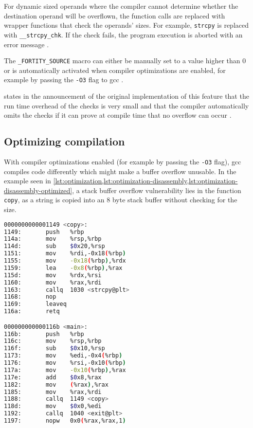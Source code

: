 For dynamic sized operands where the compiler cannot determine whether the destination operand will be overflown, the function calls are replaced with wrapper functions that check the operands' sizes.
For example, \texttt{strcpy} is replaced with \texttt{\_\_strcpy\_chk}.
If the check fails, the program execution is aborted with an error message \cite{Kerrisk2020,Sharma2014}.

The \texttt{\_FORTITY\_SOURCE} macro can either be manually set to a value higher than 0 or is automatically activated when compiler optimizations are enabled, for example by passing the \texttt{-O3} flag to \gls{gcc} \cite{Kerrisk2020,Sharma2014,Sidhpurwala2018}.

 states in the announcement of the original implementation of this feature that the run time overhead of the checks is very small and that the compiler automatically omits the checks if it can prove at compile time that no overflow can occur \cite{Jelinek2004}.

\subsection{Optimizing compilation}
\label{subsec:optimizing-compilation}

With compiler optimizations enabled (for example by passing the \texttt{-O3} flag), \gls{gcc} compiles code differently which might make a buffer overflow unusable.
In the example seen in \cref{lst:optimization,lst:optimization-disassembly,lst:optimization-disassembly-optimized}, a stack buffer overflow vulnerability lies in the function \texttt{copy}, as a string is copied into an 8 byte stack buffer without checking for the size.



\begin{lstlisting}[language=bash,float=ht,caption={Disassembly excerpt of the 64 bit binary compiled from the code in \cref{lst:optimization} with \texttt{gcc -o copy optimization.c -fno-stack-protector}, retrieved with \texttt{objdump -D --no-show-raw-insn copy}}, label={lst:optimization-disassembly}]
0000000000001149 <copy>:
1149:       push   %rbp
114a:       mov    %rsp,%rbp
114d:       sub    $0x20,%rsp
1151:       mov    %rdi,-0x18(%rbp)
1155:       mov    -0x18(%rbp),%rdx
1159:       lea    -0x8(%rbp),%rax
115d:       mov    %rdx,%rsi
1160:       mov    %rax,%rdi
1163:       callq  1030 <strcpy@plt>
1168:       nop
1169:       leaveq
116a:       retq

000000000000116b <main>:
116b:       push   %rbp
116c:       mov    %rsp,%rbp
116f:       sub    $0x10,%rsp
1173:       mov    %edi,-0x4(%rbp)
1176:       mov    %rsi,-0x10(%rbp)
117a:       mov    -0x10(%rbp),%rax
117e:       add    $0x8,%rax
1182:       mov    (%rax),%rax
1185:       mov    %rax,%rdi
1188:       callq  1149 <copy>
118d:       mov    $0x0,%edi
1192:       callq  1040 <exit@plt>
1197:       nopw   0x0(%rax,%rax,1)
\end{lstlisting}

